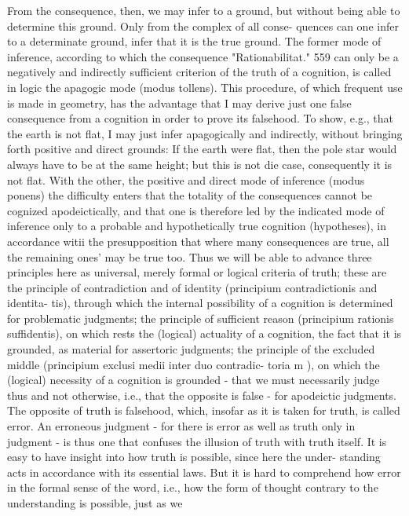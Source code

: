 From the consequence, then, we may infer to a ground, but without
being able to determine this ground. Only from the complex of all conse-
quences can one infer to a determinate ground, infer that it is the true
ground.
The former mode of inference, according to which the consequence
"Rationabilitat."
559
can only be a negatively and indirectly sufficient criterion of the truth of a
cognition, is called in logic the apagogic mode (modus tollens).
This procedure, of which frequent use is made in geometry, has the
advantage that I may derive just one false consequence from a cognition in
order to prove its falsehood. To show, e.g., that the earth is not flat, I may
just infer apagogically and indirectly, without bringing forth positive and
direct grounds: If the earth were flat, then the pole star would always have
to be at the same height; but this is not die case, consequently it is not flat.
With the other, the positive and direct mode of inference (modus ponens)
the difficulty enters that the totality of the consequences cannot be
cognized apodeictically, and that one is therefore led by the indicated
mode of inference only to a probable and hypothetically true cognition
(hypotheses), in accordance witii the presupposition that where many
consequences are true, all the remaining ones' may be true too.
Thus we will be able to advance three principles here as universal,
merely formal or logical criteria of truth; these are
the principle of contradiction and of identity (principium contradictionis and identita-
tis), through which the internal possibility of a cognition is determined for
problematic judgments;
the principle of sufficient reason (principium rationis suffidentis), on which rests
the (logical) actuality of a cognition, the fact that it is grounded, as material for
assertoric judgments;
the principle of the excluded middle (principium exclusi medii inter duo contradic-
toria m ), on which the (logical) necessity of a cognition is grounded - that we
must necessarily judge thus and not otherwise, i.e., that the opposite is false -
for apodeictic judgments.
The opposite of truth is falsehood, which, insofar as it is taken for truth, is
called error. An erroneous judgment - for there is error as well as truth
only in judgment - is thus one that confuses the illusion of truth with
truth itself.
It is easy to have insight into how truth is possible, since here the under-
standing acts in accordance with its essential laws.
But it is hard to comprehend how error in the formal sense of the word, i.e.,
how the form of thought contrary to the understanding is possible, just as we
